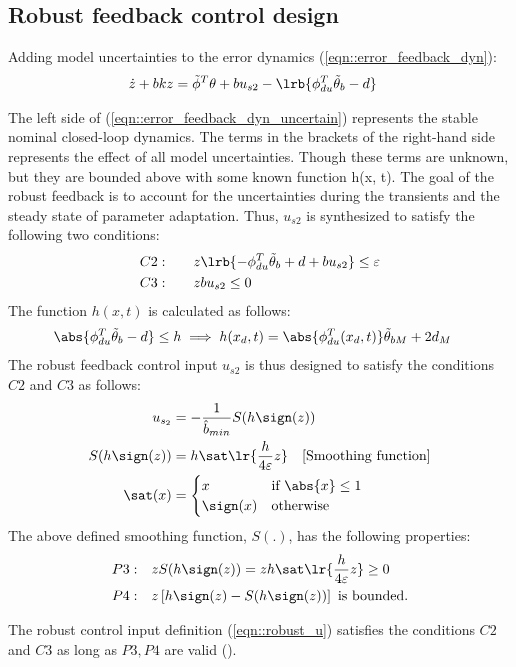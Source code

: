 \subsection{Robust feedback control design}


Adding model uncertainties to the error dynamics (\ref{eqn::error_feedback_dyn}):
\begin{align}
    \dot z + bk z &=  \tilde \phi^T \theta + bu_{s2} - \lrb{ \phi_{du}^T \tilde \theta_b - d}
    \label{eqn::error_feedback_dyn_uncertain}
\end{align}

The left side of (\ref{eqn::error_feedback_dyn_uncertain}) represents the
stable nominal closed-loop dynamics. The terms in the brackets of the right-hand side represents the effect of all model uncertainties. Though these terms
are unknown, but they are bounded above with some known function h(x, t). The
goal of the robust feedback is to account for the uncertainties during the
transients and the steady state of parameter adaptation. Thus, $u_{s2}$ is
synthesized to satisfy the following two conditions:
\begin{align}
    C2:& \qquad z \lrb{-\phi_{du}^T \tilde \theta_b + d + b u_{s2}} \leq \varepsilon \\
    C3:& \qquad z b u_{s2} \leq 0
\end{align}
The function $h(x, t)$ is calculated as follows:
\begin{align}
    \abs{\phi_{du}^T \tilde \theta_b - d} &\leq h \implies h(x_d, t) = \abs{\phi_{du}^T(x_d, t)}  \tilde \theta_{bM} + 2 d_M
    \label{eqn::h_bound}
\end{align}
The robust feedback control input $u_{s2}$ is thus designed to satisfy the conditions $C2$ and $C3$ as follows:
\begin{align}
    u_{s_2} &= -\frac{1}{\hat b_{min}} S(h \sign(z)) \label{eqn::robust_u}\\
    S(h \sign(z)) &= h \sat \lr{ \frac{h}{4 \varepsilon} z} \quad [\text{Smoothing function}]\\
    \sat (x) &= \begin{cases}
        x  & \text{if  } \abs{x} \leq   1\\
        \sign(x) &  \text{otherwise}
    \end{cases}
\end{align}
The above defined smoothing function, $S(.)$, has the following properties:
\begin{align}
    P3: & \quad z S(h \sign(z)) = z h \sat \lr{\frac{h}{4 \varepsilon} z} \geq 0\\
    P4: & \quad z \left[h \sign(z) - S(h\sign(z)) \right] \text{  is bounded.}
\end{align}

The robust control input definition (\ref{eqn::robust_u}) satisfies the
conditions $C2$ and $C3$ as long as $P3, P4$ are valid (\cite{yao1998desired}).
